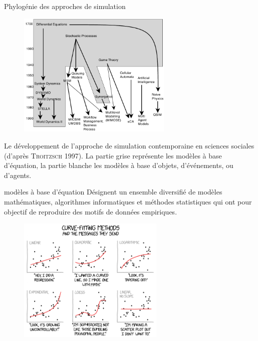 \documentclass[newPxFont]{beamer}
\begin{document}
\begin{frame}[c]{Phylogénie des approches de simulation}
  \vspace{-2em}
  \begin{figure}
   \includegraphics[height=6cm]{img/a_troitzsch_1997.png}
  \end{figure}
  \vspace{-0.8em}
  \small{Le développement de l'approche de simulation contemporaine en sciences sociales (d'après \textsc{Troitzsch} 1997). La partie grise représente les modèles à base d'équation, la partie blanche les modèles à base d'objets, d'événements, ou d'agents}.
\end{frame}

\begin{frame}[c]{modèles à base d’équation}
  \vspace{-2em}
  Désignent un ensemble diversifié de modèles mathématiques, algorithmes informatiques et méthodes statistiques qui ont pour objectif de reproduire des motifs de données empiriques.
  \begin{figure}
   \includegraphics[height=6cm]{img/a_curve_fitting.png}
  \end{figure}

\end{frame}
\end{document}
